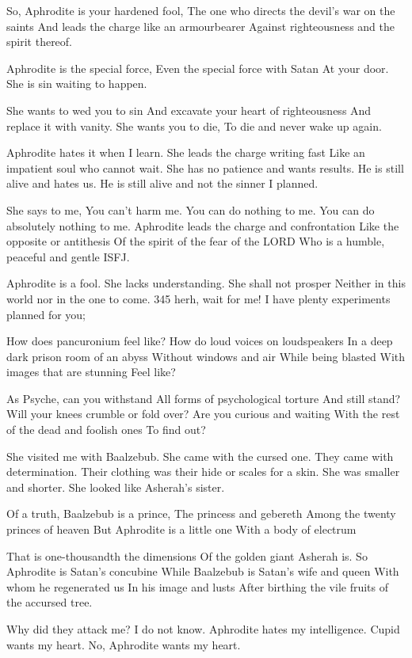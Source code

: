 \documentclass[
]{book}
\begin{document}
So, Aphrodite is your hardened fool,
The one who directs the devil's war on the saints
And leads the charge like an armourbearer
Against righteousness and the spirit thereof.

Aphrodite is the special force,
Even the special force with Satan
At your door.
She is sin waiting to happen.

She wants to wed you to sin
And excavate your heart of righteousness
And replace it with vanity.
She wants you to die,
To die and never wake up again.

Aphrodite hates it when I learn.
She leads the charge writing fast
Like an impatient soul who cannot wait.
She has no patience and wants results.
He is still alive and hates us.
He is still alive and not the sinner I planned.

She says to me, You can't harm me.
You can do nothing to me.
You can do absolutely nothing to me.
Aphrodite leads the charge and confrontation
Like the opposite or antithesis
Of the spirit of the fear of the LORD
Who is a humble, peaceful and gentle ISFJ.

Aphrodite is a fool.
She lacks understanding.
She shall not prosper
Neither in this world nor in the one to come.
345 herh, wait for me!
I have plenty experiments planned for you;

How does pancuronium feel like?
How do loud voices on loudspeakers
In a deep dark prison room of an abyss
Without windows and air
While being blasted
With images that are stunning
Feel like?

As Psyche, can you withstand
All forms of psychological torture
And still stand?
Will your knees crumble or fold over?
Are you curious and waiting
With the rest of the dead and foolish ones
To find out?

She visited me with Baalzebub.
She came with the cursed one.
They came with determination.
Their clothing was their hide or scales for a skin.
She was smaller and shorter.
She looked like Asherah's sister.

Of a truth, Baalzebub is a prince,
The princess and gebereth
Among the twenty princes of heaven
But Aphrodite is a little one
With a body of electrum

That is one-thousandth the dimensions
Of the golden giant Asherah is.
So Aphrodite is Satan's concubine
While Baalzebub is Satan's wife and queen
With whom he regenerated us
In his image and lusts
After birthing the vile fruits of the accursed tree.

Why did they attack me?
I do not know.
Aphrodite hates my intelligence.
Cupid wants my heart.
No, Aphrodite wants my heart.
\end{document}
